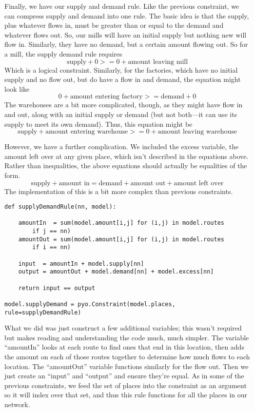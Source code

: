 \documentclass{article}
\begin{document}
Finally, we have our supply and demand rule.  Like the previous constraint, we can compress supply and demand into one rule.  The basic idea is that the supply, plus whatever flows in, must be greater than or equal to the demand and whatever flows out.  So, our mills will have an initial supply but nothing new will flow in.  Similarly, they have no demand, but a certain amount flowing out.  So for a mill, the supply demand rule requires
$$\textrm{supply} + 0 >= 0 + \textrm{amount leaving mill}$$
Which is a logical constraint.  Similarly, for the factories, which have no initial supply and no flow out, but do have a flow in and demand, the equation might look like
$$0 + \textrm{amount entering factory} >= \textrm{demand} +0$$
The warehouses are a bit more complicated, though, as they might have flow in and out, along with an initial supply or demand (but not both---it can use its supply to meet its own demand).  Thus, this equation might be
$$\textrm{supply} +\textrm{amount entering warehouse} >= 0 + \textrm{amount leaving warehouse}$$

However, we have a further complication.  We included the excess variable, the amount left over at any given place, which isn't described in the equations above.  Rather than inequalities, the above equations should actually be equalities of the form.
$$\textrm{supply} +\textrm{amount in} = \textrm{demand} +\textrm{amount out} +\textrm{amount left over}$$
The implementation of this is a bit more complex than previous constraints.

\begin{verbatim}
def supplyDemandRule(nn, model):
    
    amountIn  = sum(model.amount[i,j] for (i,j) in model.routes 
        if j == nn)
    amountOut = sum(model.amount[i,j] for (i,j) in model.routes 
        if i == nn)
    
    input  = amountIn + model.supply[nn]
    output = amountOut + model.demand[nn] + model.excess[nn]
    
    return input == output

model.supplyDemand = pyo.Constraint(model.places, rule=supplyDemandRule)
\end{verbatim}

What we did was just construct a few additional variables; this wasn't required but makes reading and understanding the code much, much simpler.  The variable ``amountIn'' looks at each route to find ones that end in this location, then adds the amount on each of those routes together to determine how much flows to each location.  The ``amountOut'' variable functions similarly for the flow out.  Then we just create an ``input'' and ``output'' and ensure they're equal.  As in some of the previous constraints, we feed the set of places into the constraint as an argument so it will index over that set, and thus this rule functions for all the places in our network.
\end{document}

